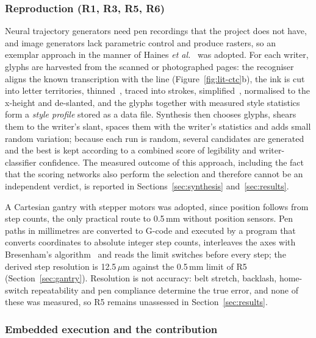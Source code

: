 \subsubsection{Reproduction (R1, R3, R5, R6)}

Neural trajectory generators need pen recordings that the project does not have, and image generators lack parametric control and produce rasters, so an exemplar approach in the manner of Haines \emph{et al.}~\cite{haines2016} was adopted.
For each writer, glyphs are harvested from the scanned or photographed pages: the recogniser aligns the known transcription with the line (Figure~\ref{fig:lit-ctc}b), the ink is cut into letter territories, thinned~\cite{zhang1984}, traced into strokes, simplified~\cite{douglas1973}, normalised to the x-height and de-slanted, and the glyphs together with measured style statistics form a \emph{style profile} stored as a data file.
Synthesis then chooses glyphs, shears them to the writer's slant, spaces them with the writer's statistics and adds small random variation; because each run is random, several candidates are generated and the best is kept according to a combined score of legibility and writer-classifier confidence.
The measured outcome of this approach, including the fact that the scoring networks also perform the selection and therefore cannot be an independent verdict, is reported in Sections~\ref{sec:synthesis} and~\ref{sec:results}.

A Cartesian gantry with stepper motors was adopted, since position follows from step counts, the only practical route to 0.5\,mm without position sensors.
Pen paths in millimetres are converted to G-code and executed by a program that converts coordinates to absolute integer step counts, interleaves the axes with Bresenham's algorithm~\cite{bresenham1965} and reads the limit switches before every step; the derived step resolution is 12.5\,$\mu$m against the 0.5\,mm limit of R5 (Section~\ref{sec:gantry}).
Resolution is not accuracy: belt stretch, backlash, home-switch repeatability and pen compliance determine the true error, and none of these was measured, so R5 remains unassessed in Section~\ref{sec:results}.

\subsubsection{Embedded execution and the contribution}

